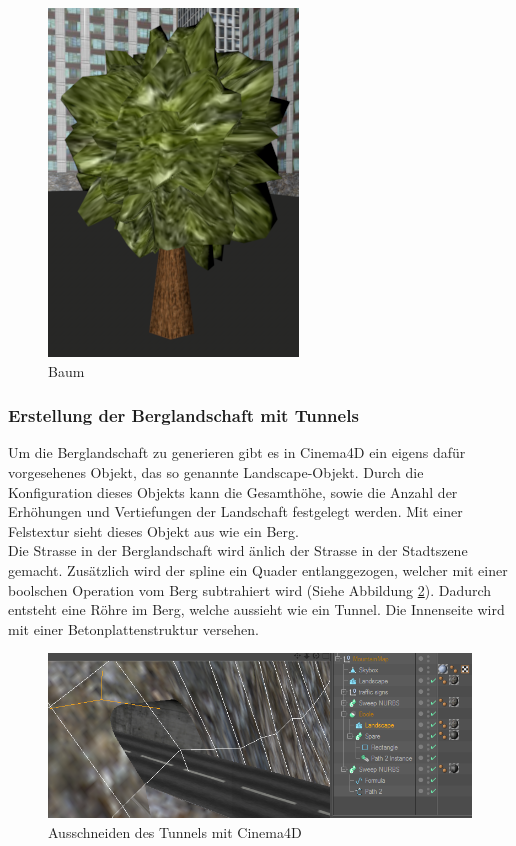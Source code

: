 \begin{figure}[H]
\centering 
\includegraphics[scale=0.4]{src/screenshot_tree.png}
\caption{Baum} %
\label{screenshot_tree} %
\end{figure}

\subsubsection{Erstellung der Berglandschaft mit Tunnels}
Um die Berglandschaft zu generieren gibt es in Cinema4D ein eigens dafür vorgesehenes Objekt, das so genannte Landscape-Objekt. Durch die Konfiguration dieses Objekts kann die Gesamthöhe, sowie die Anzahl der Erhöhungen und Vertiefungen der Landschaft festgelegt werden. Mit einer Felstextur sieht dieses Objekt aus wie ein Berg.\\
Die Strasse in der Berglandschaft wird änlich der Strasse in der Stadtszene gemacht. Zusätzlich wird der \gls{spline} ein Quader entlanggezogen, welcher mit einer boolschen Operation vom Berg subtrahiert wird (Siehe Abbildung \ref{cinema4d_ausschneiden_tunnel}). Dadurch entsteht eine Röhre im Berg, welche aussieht wie ein Tunnel. Die Innenseite wird mit einer Betonplattenstruktur versehen.

\begin{figure}[H]
\centering 
\includegraphics[width=1\linewidth]{src/screenshot_cinema4d.png}
\caption{Ausschneiden des Tunnels mit Cinema4D} %
\label{cinema4d_ausschneiden_tunnel} %
\end{figure}

